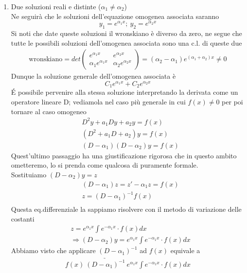 \documentclass[10pt,a4paper]{article}
\begin{document}
\begin{enumerate}
	\item Due soluzioni reali e distinte (\(\alpha_1 \neq \alpha_2\))\\
	Ne seguirà che le soluzioni dell'equazione omogenea associata saranno 
	\[y_1 = e^{\alpha_1 x};\ y_2 = e^{\alpha_2 x}\]
	Si noti che date queste soluzioni il wronskiano è diverso da zero, ne segue che tutte le possibili soluzioni dell'omogenea associata sono una c.l. di queste due
	\begin{align*}
		\text{wronskiano}=det
		\begin{pmatrix}
			e^{\alpha_1 x}&e^{\alpha_2 x}\\
			\alpha_1 e^{\alpha_1 x}&\alpha_2 e^{\alpha_2 x}
		\end{pmatrix}
	=(\alpha_2 - \alpha_1)e^{(\alpha_1+\alpha_2) x}\neq 0
	\end{align*}
	Dunque la soluzione generale dell'omogenea associata è 
	\[C_1 e^{\alpha_1 x}+ C_2 e^{\alpha_2 x}\]
	\'{E} possibile pervenire alla stessa soluzione interpretando la derivata come un operatore lineare D; vediamola nel caso più generale in cui $f(x)\neq 0$ per poi tornare al caso omogeneo
	\begin{align*}
		&D^2y + a_1 Dy + a_2 y = f(x) \\
		&(D^2 + a_1 D + a_2) y = f(x)\\
		&(D-\alpha_1)(D-\alpha_2)y =f(x)
	\end{align*}
	Quest'ultimo passaggio ha una giustificazione rigorosa che in questo ambito ometteremo, lo si prenda come qualcosa di puramente formale. \\
	Sostituiamo \((D-\alpha_2)y = z\)
	\begin{align*}
		&(D-\alpha_1)z = z'-\alpha_1 z=f(x)\\
		&z = (D-\alpha_1)^{-1}f(x)\\
	\end{align*}
	Questa eq.differenziale la sappiamo risolvere con il metodo di variazione delle costanti
	\begin{align*}
		&z = e^{\alpha_1 x} \int e^{-\alpha_1 x}\cdot f(x) dx\\
		&\Rightarrow (D-\alpha_2) y = e^{\alpha_1 x} \int e^{-\alpha_1 x}\cdot f(x) dx
	\end{align*}
	Abbiamo visto che applicare \((D-\alpha_1)^{-1}\) ad \(f(x)\) equivale a 
	\begin{align*}
	f(x)\  \underrightarrow{(D-\alpha_1)^{-1}}\ e^{\alpha_1 x} \int e^{-\alpha_1 x}\cdot f(x) dx
	\end{align*}

\end{enumerate}
\end{document}
